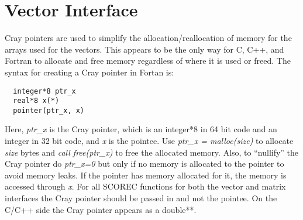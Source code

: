 \section{Vector Interface}
Cray pointers are used to simplify the allocation/reallocation of memory for the arrays used
for the vectors.  This appears to be the only way for C, C++, and Fortran to 
allocate and free memory regardless of where it is used or freed.  The syntax for creating
a Cray pointer in Fortan is:
\begin{verbatim}
  integer*8 ptr_x
  real*8 x(*)
  pointer(ptr_x, x)
\end{verbatim}
Here, \textit{ptr\_x} is the Cray pointer, which is an integer*8 in 64 bit code and an integer in 32 bit code,
and \textit{x} is the pointee.  Use \textit{ptr\_x = malloc(size)}
to allocate \textit{size} bytes and \textit{call free(ptr\_x)} to free the allocated memory.
Also, to ``nullify'' the Cray pointer do \textit{ptr\_x=0} but only if no memory is allocated to
the pointer to avoid memory leaks.  If the pointer has memory allocated for it, the memory is accessed through
\textit{x}.  For all SCOREC functions for both the vector and matrix interfaces the Cray pointer
should be passed in and not the pointee. On the C/C++ side the Cray pointer appears as
a double**.


